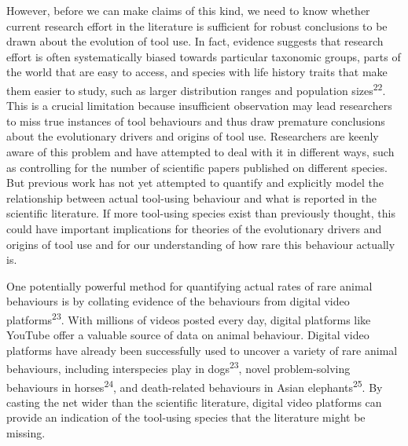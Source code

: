 \documentclass[
  man, donotrepeattitle,floatsintext]{apa6}
\begin{document}
However, before we can make claims of this kind, we need to know whether current
research effort in the literature is sufficient for robust conclusions to be
drawn about the evolution of tool use. In fact, evidence suggests that research
effort is often systematically biased towards particular taxonomic groups, parts
of the world that are easy to access, and species with life history traits that
make them easier to study, such as larger distribution ranges and population
sizes\textsuperscript{22}. This is a crucial limitation because insufficient
observation may lead researchers to miss true instances of tool behaviours and
thus draw premature conclusions about the evolutionary drivers and origins of
tool use. Researchers are keenly aware of this problem and have attempted to
deal with it in different ways, such as controlling for the number of scientific
papers published on different species. But previous work has not yet attempted
to quantify and explicitly model the relationship between actual tool-using
behaviour and what is reported in the scientific literature. If more tool-using
species exist than previously thought, this could have important implications
for theories of the evolutionary drivers and origins of tool use and for our
understanding of how rare this behaviour actually is.

One potentially powerful method for quantifying actual rates of rare animal
behaviours is by collating evidence of the behaviours from digital video
platforms\textsuperscript{23}. With millions of videos posted every day, digital
platforms like YouTube offer a valuable source of data on animal behaviour.
Digital video platforms have already been successfully used to uncover a variety
of rare animal behaviours, including interspecies play in dogs\textsuperscript{23},
novel problem-solving behaviours in horses\textsuperscript{24}, and death-related
behaviours in Asian elephants\textsuperscript{25}. By casting the net wider than the
scientific literature, digital video platforms can provide an indication of the
tool-using species that the literature might be missing.
\end{document}
